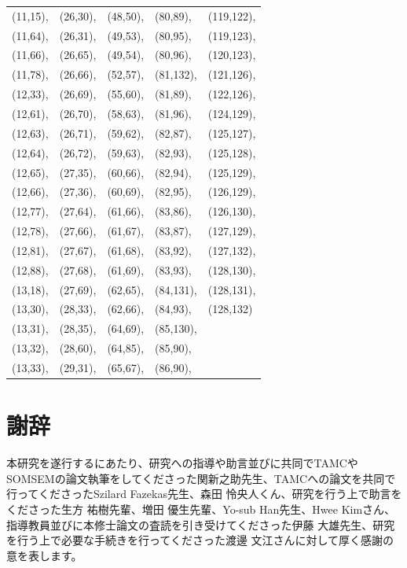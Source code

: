 \documentclass[a4,11pt]{article}
\begin{document}
\begin{center}
\begin{longtable}[p]{l l l l l}
(11,15),&(26,30),&(48,50),&(80,89),&(119,122),\\
(11,64),&(26,31),&(49,53),&(80,95),&(119,123),\\
(11,66),&(26,65),&(49,54),&(80,96),&(120,123),\\
(11,78),&(26,66),&(52,57),&(81,132),&(121,126),\\
(12,33),&(26,69),&(55,60),&(81,89),&(122,126),\\
(12,61),&(26,70),&(58,63),&(81,96),&(124,129),\\
(12,63),&(26,71),&(59,62),&(82,87),&(125,127),\\
(12,64),&(26,72),&(59,63),&(82,93),&(125,128),\\
(12,65),&(27,35),&(60,66),&(82,94),&(125,129),\\
(12,66),&(27,36),&(60,69),&(82,95),&(126,129),\\
(12,77),&(27,64),&(61,66),&(83,86),&(126,130),\\
(12,78),&(27,66),&(61,67),&(83,87),&(127,129),\\
(12,81),&(27,67),&(61,68),&(83,92),&(127,132),\\
(12,88),&(27,68),&(61,69),&(83,93),&(128,130),\\
(13,18),&(27,69),&(62,65),&(84,131),&(128,131),\\
(13,30),&(28,33),&(62,66),&(84,93),&(128,132)  \\
(13,31),&(28,35),&(64,69),&(85,130),&\\
(13,32),&(28,60),&(64,85),&(85,90),&\\
(13,33),&(29,31),&(65,67),&(86,90),&\\
\end{longtable}
\end{center}

\section{謝辞}
本研究を遂行するにあたり、研究への指導や助言並びに共同でTAMCやSOMSEMの論文執筆をしてくださった関新之助先生、TAMCへの論文を共同で行ってくださったSzilard Fazekas先生、森田 怜央人くん、研究を行う上で助言をくださった生方 祐樹先輩、増田 優生先輩、Yo-sub Han先生、Hwee Kimさん、指導教員並びに本修士論文の査読を引き受けてくださった伊藤 大雄先生、研究を行う上で必要な手続きを行ってくださった渡邊 文江さんに対して厚く感謝の意を表します。



\end{document}
